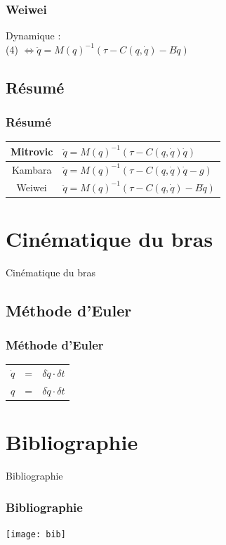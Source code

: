 \documentclass{beamer}
\begin{document}
\begin{frame}
\frametitle{Weiwei}
Dynamique :\\
(4) $\Leftrightarrow \ddot{q} = M(q)^{-1} (\tau - C(q, \dot{q}) - B\dot{q}) $
\end{frame}

\subsection{Résumé}

\begin{frame}
\frametitle{Résumé}
\begin{tabular}{|c|l|}
    \hline
    Mitrovic & $\ddot{q} = M(q)^{-1} (\tau - C(q, \dot{q}) \dot{q})$ \\
    \hline
    Kambara  & $\ddot{q} = M(q)^{-1} (\tau - C(q, \dot{q}) \dot{q} - g)$ \\
    \hline
    Weiwei   & $\ddot{q} = M(q)^{-1} (\tau - C(q, \dot{q}) - B\dot{q})$ \\
    \hline
\end{tabular}
\end{frame}


\section{Cinématique du bras}
\begin{frame}
\begin{center}
{\LARGE Cinématique du bras}
\end{center}
\end{frame}

\subsection{Méthode d'Euler}

\begin{frame}
\frametitle{Méthode d'Euler}
\begin{tabular}{lcl}
    $\dot{q}$ & = & $\delta \ddot{q} \cdot \delta t$ \\
    $q$ & = & $\delta \dot{q} \cdot \delta t$ \\
\end{tabular}
\end{frame}
    

\section{Bibliographie}
\begin{frame}
\begin{center}
{\LARGE Bibliographie}
\end{center}
\end{frame}

\begin{frame}
\frametitle{Bibliographie}
\begin{center}
        \texttt{[image: bib]}
\end{center}
\end{frame}
\end{document}
